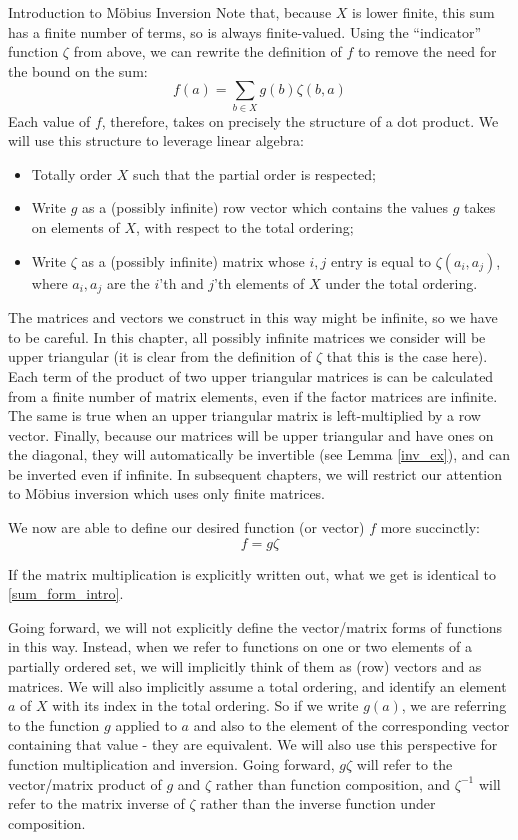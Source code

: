 \documentclass[12pt]{pom_thesis}
\begin{document}
\begin{chapter}{Introduction to M\"obius Inversion}
Note that, because $X$ is lower finite, this sum has a finite number of terms, so is always finite-valued. Using the ``indicator'' function $\zeta$ from above, we can rewrite the definition of $f$ to remove the need for the bound on the sum:
\begin{equation}\label{sum_form_intro}
f(a) = \sum_{b \in X}g(b)\zeta(b,a)
\end{equation}
Each value of $f$, therefore, takes on precisely the structure of a dot product. We will use this structure to leverage linear algebra: 
\begin{itemize}
\item Totally order $X$ such that the partial order is respected;
\item Write $g$ as a (possibly infinite) row vector which contains the values $g$ takes on elements of $X$, with respect to the total ordering;
\item Write $\zeta$ as a (possibly infinite) matrix whose $i,j$ entry is equal to $\zeta(a_i, a_j)$, where $a_i, a_j$ are the $i$'th and $j$'th elements of $X$ under the total ordering.
\end{itemize}

The matrices and vectors we construct in this way might be infinite, so we have to be careful. In this chapter, all possibly infinite matrices we consider will be upper triangular (it is clear from the definition of $\zeta$ that this is the case here). Each term of the product of two upper triangular matrices is can be calculated from a finite number of matrix elements, even if the factor matrices are infinite. The same is true when an upper triangular matrix is left-multiplied by a row vector. Finally, because our matrices will be upper triangular and have ones on the diagonal, they will automatically be invertible (see Lemma \ref{inv_ex}), and can be inverted even if infinite. In subsequent chapters, we will restrict our attention to M\"obius inversion which uses only finite matrices.

We now are able to define our desired function (or vector) $f$ more succinctly:
\[
f = g \zeta
\]

If the matrix multiplication is explicitly written out, what we get is identical to \eqref{sum_form_intro}.

Going forward, we will not explicitly define the vector/matrix forms of functions in this way. Instead, when we refer to functions on one or two elements of a partially ordered set, we will implicitly think of them as (row) vectors and as matrices. We will also implicitly assume a total ordering, and identify an element $a$ of $X$ with its index in the total ordering. So if we write $g(a)$, we are referring to the function $g$ applied to $a$ and also to the element of the corresponding vector containing that value - they are equivalent. We will also use this perspective for function multiplication and inversion. Going forward, $g\zeta$ will refer to the vector/matrix product of $g$ and $\zeta$ rather than function composition, and $\zeta^{-1}$ will refer to the matrix inverse of $\zeta$ rather than the inverse function under composition.


\end{chapter}
\end{document}
